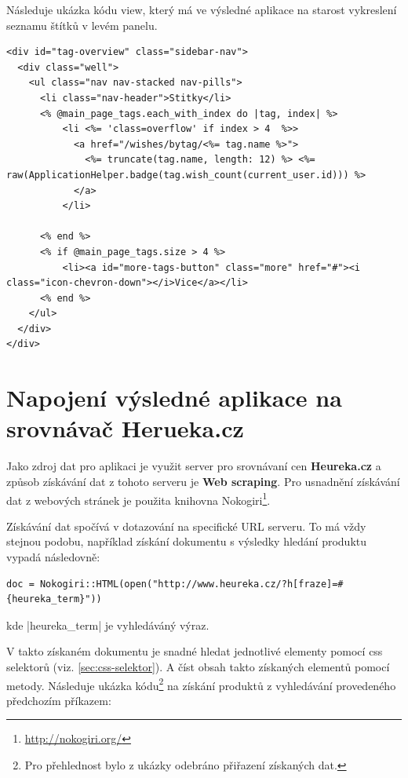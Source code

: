 Následuje ukázka kódu view, který má ve výsledné aplikace na starost vykreslení seznamu štítků v levém panelu.

\lstset{language = html, style=custom}
\begin{lstlisting}
<div id="tag-overview" class="sidebar-nav">
  <div class="well">
    <ul class="nav nav-stacked nav-pills">
      <li class="nav-header">Stitky</li>
      <% @main_page_tags.each_with_index do |tag, index| %>
          <li <%= 'class=overflow' if index > 4  %>>
            <a href="/wishes/bytag/<%= tag.name %>">
              <%= truncate(tag.name, length: 12) %> <%= raw(ApplicationHelper.badge(tag.wish_count(current_user.id))) %>
            </a>
          </li>

      <% end %>
      <% if @main_page_tags.size > 4 %>
          <li><a id="more-tags-button" class="more" href="#"><i class="icon-chevron-down"></i>Vice</a></li>
      <% end %>
    </ul>
  </div>
</div>
\end{lstlisting}

\section{Napojení výsledné aplikace na srovnávač Herueka.cz}
Jako zdroj dat pro aplikaci je využit server pro srovnávaní cen \textbf{Heureka.cz} a způsob získávání dat z tohoto serveru je \textbf{Web scraping}. Pro usnadnění získávání dat z webových stránek je použita knihovna Nokogiri\footnote{\url{http://nokogiri.org/}}.

Získávání dat spočívá v dotazování na specifické URL serveru. To má vždy stejnou podobu, například získání dokumentu s výsledky hledání produktu vypadá následovně:

\lstset{language = ruby, style=custom}
\begin{lstlisting}
doc = Nokogiri::HTML(open("http://www.heureka.cz/?h[fraze]=#{heureka_term}"))
\end{lstlisting}

\noindent kde |heureka_term| je vyhledáváný výraz.

V takto získaném dokumentu je snadné hledat jednotlivé elementy pomocí css selektorů (viz. \ref{sec:css-selektor}). A číst obsah takto získaných elementů pomocí metody. Následuje ukázka kódu\footnote{Pro přehlednost bylo z ukázky odebráno přiřazení získaných dat.} na získání produktů z vyhledávání provedeného předchozím příkazem:

